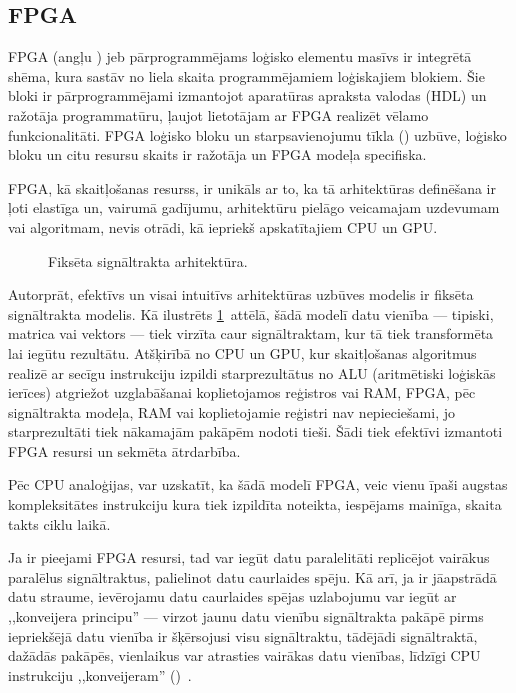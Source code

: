 \subsection{FPGA} \label{sec:fpga}
FPGA (angļu ) jeb
pārprogrammējams loģisko elementu masīvs ir integrētā shēma, kura sastāv no
liela skaita programmējamiem loģiskajiem blokiem. Šie bloki ir pārprogrammējami
izmantojot aparatūras apraksta valodas (HDL) un ražotāja programmatūru,
ļaujot lietotājam ar FPGA realizēt vēlamo funkcionalitāti.
FPGA loģisko bloku un starpsavienojumu tīkla ()
uzbūve, loģisko bloku un citu resursu skaits ir ražotāja un
FPGA modeļa specifiska. \cite{JIS}

FPGA, kā skaitļošanas resurss, ir unikāls ar to, ka tā arhitektūras definēšana
ir ļoti elastīga un, vairumā gadījumu, arhitektūru pielāgo veicamajam
uzdevumam vai algoritmam, nevis otrādi, kā iepriekš apskatītajiem CPU un GPU.

\begin{figure}[tbh]
	\centering
	\def\svgscale{1.2}
	{}
	\caption{Fiksēta signāltrakta arhitektūra.}
	\label{fig:fpga-arch}
\end{figure}
Autorprāt, efektīvs un visai intuitīvs arhitektūras uzbūves modelis ir
fiksēta signāltrakta modelis. Kā ilustrēts \ref{fig:fpga-arch}~attēlā, šādā
modelī datu vienība --- tipiski, matrica vai vektors --- tiek virzīta caur
signāltraktam, kur tā tiek transformēta lai iegūtu rezultātu. Atšķirībā no
CPU un GPU, kur skaitļošanas algoritmus realizē ar secīgu instrukciju izpildi
starprezultātus no ALU (aritmētiski loģiskās ierīces)
atgriežot uzglabāšanai koplietojamos reģistros vai RAM,
FPGA, pēc signāltrakta modeļa, RAM vai koplietojamie reģistri nav
nepieciešami, jo starprezultāti tiek nākamajām pakāpēm nodoti tieši.
Šādi tiek efektīvi izmantoti FPGA resursi un sekmēta ātrdarbība.

Pēc CPU analoģijas, var uzskatīt, ka šādā modelī FPGA, veic vienu
īpaši augstas kompleksitātes instrukciju kura tiek izpildīta noteikta,
iespējams mainīga, skaita takts ciklu laikā.

Ja ir pieejami FPGA resursi, tad var iegūt datu paralelitāti replicējot 
vairākus paralēlus signāltraktus, palielinot datu caurlaides spēju. Kā arī, ja ir
jāapstrādā datu straume, ievērojamu datu caurlaides spējas uzlabojumu var
iegūt ar ,,konveijera principu'' --- virzot jaunu datu vienību
signāltrakta pakāpē pirms iepriekšējā datu vienība ir šķērsojusi visu
signāltraktu, tādējādi signāltraktā, dažādās pakāpēs, vienlaikus
var atrasties vairākas datu vienības, līdzīgi CPU instrukciju ,,konveijeram''
()~\cite{Flynn-arch}.

